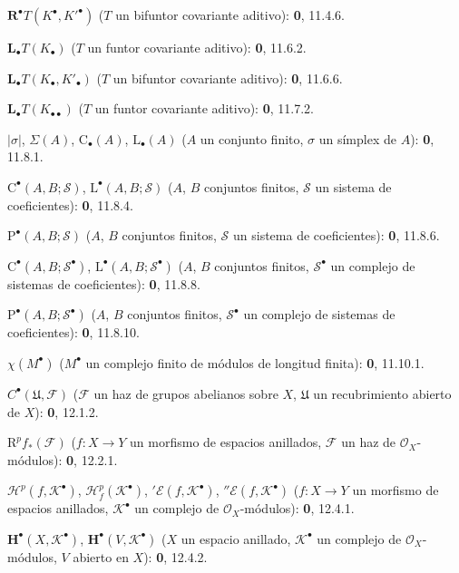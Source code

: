 \begin{flushleft}
$\mathbf R^\bullet T(K^\bullet,K'^{\bullet})$ ($T$ un bifuntor covariante
aditivo): \textbf 0, 11.4.6.

$\mathbf L_\bullet T(K_\bullet)$ ($T$ un funtor covariante aditivo): \textbf 0, 11.6.2.

$\mathbf L_\bullet T(K_\bullet,K'_\bullet)$ ($T$ un bifuntor covariante
aditivo): \textbf 0, 11.6.6.

$\mathbf L_\bullet T(K_{\bullet\bullet})$ ($T$ un funtor covariante aditivo):
\textbf 0, 11.7.2.

$|\sigma|$, $\Sigma(A)$, $\mathrm C_\bullet(A)$, $\mathrm L_\bullet(A)$
($A$ un conjunto finito, $\sigma$ un símplex de $A$): \textbf 0, 11.8.1.

$\mathrm C^\bullet(A,B;\mathscr S)$, $\mathrm L^\bullet(A,B;\mathscr S)$
($A$, $B$ conjuntos finitos, $\mathscr S$ un sistema de coeficientes): \textbf 0, 11.8.4.

$\mathrm P^\bullet(A,B;\mathscr S)$ ($A$, $B$ conjuntos finitos, $\mathscr S$ un
sistema de coeficientes): \textbf 0, 11.8.6.

$\mathrm C^\bullet(A,B;\mathscr S^\bullet)$,
$\mathrm L^\bullet(A,B;\mathscr S^\bullet)$ ($A$, $B$ conjuntos finitos,
$\mathscr S^\bullet$ un complejo de sistemas de coeficientes): \textbf 0, 11.8.8.

$\mathrm P^\bullet(A,B;\mathscr S^\bullet)$ ($A$, $B$ conjuntos finitos,
$\mathscr S^\bullet$ un complejo de sistemas de coeficientes): \textbf 0, 11.8.10.

$\chi(M^\bullet)$ ($M^\bullet$ un complejo finito de módulos de longitud finita):
\textbf 0, 11.10.1.

$C^\bullet(\mathfrak U,\mathcal F)$ ($\mathcal F$ un haz de grupos abelianos
sobre $X$, $\mathfrak U$ un recubrimiento abierto de $X$): \textbf 0, 12.1.2.

$\mathrm R^pf_*(\mathcal F)$ ($f:X\to Y$ un morfismo de espacios anillados,
$\mathcal F$ un haz de $\mathcal O_X$-módulos): \textbf 0, 12.2.1.

$\mathscr H^p(f,\mathcal K^\bullet)$,
$\mathscr H_f^p(\mathcal K^\bullet)$, ${}'\mathcal E(f,\mathcal K^\bullet)$,
${}''\mathcal E(f,\mathcal K^\bullet)$ ($f:X\to Y$ un morfismo de espacios anillados,
$\mathcal K^\bullet$ un complejo de $\mathcal O_X$-módulos): \textbf 0, 12.4.1.

$\mathbf H^\bullet(X,\mathcal K^\bullet)$,
$\mathbf H^\bullet(V,\mathcal K^\bullet)$ ($X$ un espacio anillado,
$\mathcal K^\bullet$ un complejo de $\mathcal O_X$-módulos, $V$ abierto en $X$):
\textbf 0, 12.4.2.


\end{flushleft}
